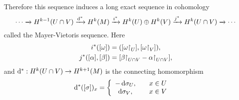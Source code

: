 Therefore this sequence induces a long exact sequence in cohomology
$$
\cdots               \xrightarrow{}
H^{k-1}(U \cap V)     \xrightarrow{\mathop{}\!\mathrm{d}^\ast}
H^k(M)               \xrightarrow{i^\ast}
H^k(U) \oplus H^k(V) \xrightarrow{j^\ast}
H^k(U \cap V)        \xrightarrow{}
\cdots
$$
called the Mayer-Vietoris sequence. Here
\begin{align*}
   i^\ast([\omega])
&= ([\omega\mathord{\upharpoonright}_U], [\omega\mathord{\upharpoonright}_V]), \\
   j^\ast([\alpha], [\beta])
&= [\beta\mathord{\upharpoonright}_{U \cap V} - \alpha\mathord{\upharpoonright}_{U \cap V}],
\end{align*}
and $\mathop{}\!\mathrm{d}^\ast : H^k(U \cap V) \to H^{k+1}(M)$ is the connecting
homomorphism
\begin{align*}
   \mathop{}\!\mathrm{d}^\ast([\sigma])_x
&= \left\{
     \begin{array}{c c}
       -\mathop{}\!\mathrm{d} \sigma_U, & \quad x \in U \\
       \mathop{}\!\mathrm{d} \sigma_V,  & \quad x \in V
     \end{array}
   \right.
\end{align*}

